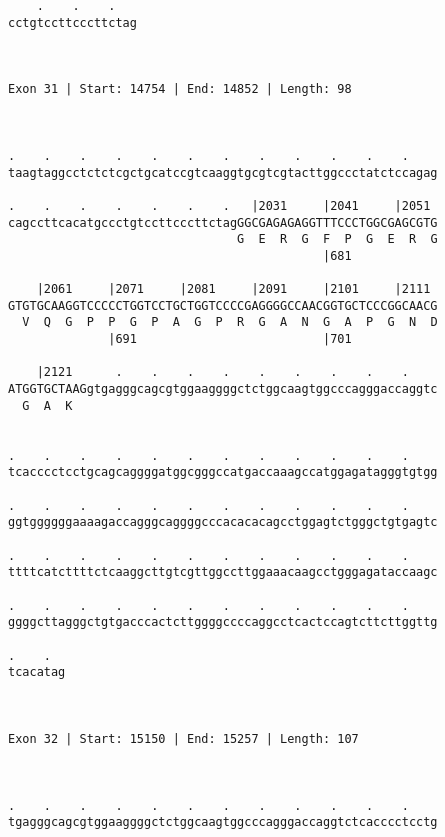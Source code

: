 \documentclass{article}
\begin{document}
\begin{Verbatim}
    .    .    .   
cctgtccttcccttctag
                  
                  
 
Exon 31 | Start: 14754 | End: 14852 | Length: 98



.    .    .    .    .    .    .    .    .    .    .    .    
taagtaggcctctctcgctgcatccgtcaaggtgcgtcgtacttggccctatctccagag
                                                            
.    .    .    .    .    .    .   |2031     |2041     |2051 
cagccttcacatgccctgtccttcccttctagGGCGAGAGAGGTTTCCCTGGCGAGCGTG
                                G  E  R  G  F  P  G  E  R  G
                                            |681            
  
    |2061     |2071     |2081     |2091     |2101     |2111 
GTGTGCAAGGTCCCCCTGGTCCTGCTGGTCCCCGAGGGGCCAACGGTGCTCCCGGCAACG
  V  Q  G  P  P  G  P  A  G  P  R  G  A  N  G  A  P  G  N  D
              |691                          |701            
  
    |2121      .    .    .    .    .    .    .    .    .    
ATGGTGCTAAGgtgagggcagcgtggaaggggctctggcaagtggcccagggaccaggtc
  G  A  K                                                   
                                                            
  
.    .    .    .    .    .    .    .    .    .    .    .    
tcacccctcctgcagcaggggatggcgggccatgaccaaagccatggagatagggtgtgg
                                                            
.    .    .    .    .    .    .    .    .    .    .    .    
ggtggggggaaaagaccagggcaggggcccacacacagcctggagtctgggctgtgagtc
                                                            
.    .    .    .    .    .    .    .    .    .    .    .    
ttttcatcttttctcaaggcttgtcgttggccttggaaacaagcctgggagataccaagc
                                                            
.    .    .    .    .    .    .    .    .    .    .    .    
ggggcttagggctgtgacccactcttggggccccaggcctcactccagtcttcttggttg
                                                            
.    .  
tcacatag
        
        
 
Exon 32 | Start: 15150 | End: 15257 | Length: 107



.    .    .    .    .    .    .    .    .    .    .    .    
tgagggcagcgtggaaggggctctggcaagtggcccagggaccaggtctcacccctcctg
                                                            

\end{Verbatim}
\end{document}
